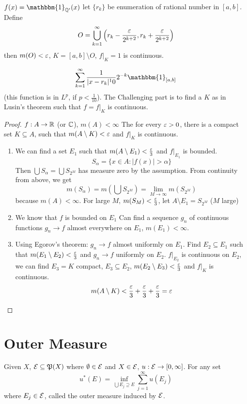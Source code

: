 \begin{example}
  $f(x) = \mathbbm{1}_{\QQ'}(x)$
  let $\{r_k\}$ be enumeration of rational number in $[a, b]$. Define
  \[O = \bigcup_{k=1}^\infty \left(r_k - \frac{\varepsilon}{2^{k+2}}, r_k + \frac{\varepsilon}{2^{k+2}}\right)\]
  then $m(O) < \varepsilon$, $K = [a, b] \setminus O$, $f|_K = 1$ is continuous.
\end{example}

\begin{example}
  \[\sum_{k=1}^\infty \frac1{|x - r_k|^10}2^{-k} \mathbbm{1}_{[a, b]}\]
  (this function is in $L^p$, if $p < \frac1{10}$).
  The Challenging part is to find a $K$ as in Lusin's theorem such that
  $f = f|_K$ is continuous.
\end{example}

\begin{proof}
$f: A \to \mathbb R$ (or $\mathbb C$), $m(A) < \infty$
The for every $\varepsilon > 0$, there is a compact set $K \subseteq A$, such that 
$m(A \setminus K) < \varepsilon$ and $f|_K$ is continuous.

\begin{enumerate}
  \item We can find a set $E_1$ such that $m(A\setminus E_1) < \frac{\varepsilon}3$ and $f|_{E_1}$ is bounded.
  \[S_\alpha = \{x \in A : |f(x)| > \alpha\}\]
  Then $\bigcup S_\alpha = \bigcup S_{2^M}$ has measure zero by the assumption. From continuity from above, we get
  \[m(S_\alpha) = m\left(\bigcup S_{2^M}\right) = \lim_{M\to\infty}m(S_{2^M})\]
  because $m(A) < \infty$. For large $M$, $m(S_M) < \frac{\varepsilon}3$, let $A \setminus E_1 = S_{2^M}$ ($M$ large)
  \item We know that $f$ is bounded on $E_1$
  Can find a sequence $g_n$ of continuous functions $g_n \to f$ almost everywhere on $E_1$, $m(E_1) < \infty$.
  \item Using Egorov's theorem: $g_n \to f$ almost uniformly on $E_1$.
  Find $E_2 \subseteq E_1$ such that $m(E_1 \setminus E_2) < \frac{\varepsilon}3$ and $g_n \to f$ uniformly on $E_2$.
  $f|_{E_2}$ is continuous on $E_2$, we can find $E_3 = K$ compact, $E_3 \subseteq E_2$, 
  $m(E_2 \setminus E_3) < \frac{\varepsilon}3$ and $f|_K$ is continuous.
  \[m(A\setminus K) < \frac{\varepsilon}3 + \frac{\varepsilon}3 + \frac{\varepsilon}3 = \varepsilon\]
\end{enumerate}
\end{proof}

\section{Outer Measure}
\begin{definition}
  Given $X$, $\mathcal E \subseteq \mathfrak{P}(X)$ where $\emptyset \in \mathcal E$ and $X \in \mathcal E$, $u: \mathcal E \to [0, \infty]$.
  For any set 
  \[u^*(E) = \inf_{\bigcup E_j \supseteq E}\sum_{j=1}^\infty u(E_j)\]
  where $E_j \in \mathcal E$, called the outer measure induced by $\mathcal E$.
\end{definition}


